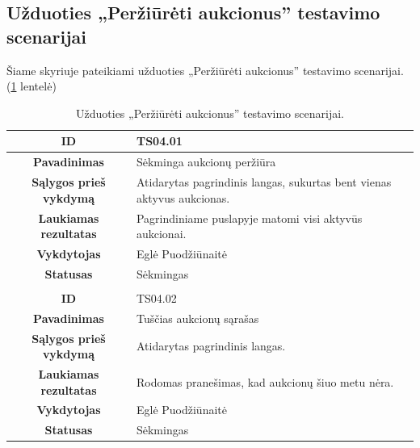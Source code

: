 \documentclass{VUMIFPSkursinis}
\begin{document}
			\subsection{Užduoties „Peržiūrėti aukcionus” testavimo scenarijai}
	Šiame skyriuje pateikiami užduoties „Peržiūrėti aukcionus” testavimo scenarijai. (\ref{perziura} lentelė)
	\begin{table}[H]
		\caption{Užduoties „Peržiūrėti aukcionus” testavimo scenarijai.}
		\begin{tabular}{|p{6cm}|p{11cm}|}
			\hline
			\multicolumn{1}{|c|}{{\bfseries ID}}&
			{TS04.01}\\
			\hline
			\multicolumn{1}{|c|}{{\bfseries Pavadinimas}}&
			{Sėkminga aukcionų peržiūra}\\
			\hline
			\multicolumn{1}{|c|}{{\bfseries Sąlygos prieš vykdymą}}&
			{Atidarytas pagrindinis langas, sukurtas bent vienas aktyvus aukcionas.}\\
			\hline
			\multicolumn{1}{|c|}{{\bfseries Laukiamas rezultatas}}&
			{Pagrindiniame puslapyje matomi visi aktyvūs aukcionai.}\\
			\hline
			\multicolumn{1}{|c|}{{\bfseries Vykdytojas}}&
			{Eglė Puodžiūnaitė}\\
			\hline
			\multicolumn{1}{|c|}{{\bfseries Statusas}}&
			{Sėkmingas}\\
			\hline
			\rowcolor{lightgray}
			\multicolumn{2}{|c|}{}\\
			\hline
			\multicolumn{1}{|c|}{{\bfseries ID}}&
			{TS04.02}\\
			\hline
			\multicolumn{1}{|c|}{{\bfseries Pavadinimas}}&
			{Tuščias aukcionų sąrašas}\\
			\hline
			\multicolumn{1}{|c|}{{\bfseries Sąlygos prieš vykdymą}}&
			{Atidarytas pagrindinis langas.}\\
			\hline
			\multicolumn{1}{|c|}{{\bfseries Laukiamas rezultatas}}&
			{Rodomas pranešimas, kad aukcionų šiuo metu nėra.}\\
			\hline
			\multicolumn{1}{|c|}{{\bfseries Vykdytojas}}&
			{Eglė Puodžiūnaitė}\\
			\hline
			\multicolumn{1}{|c|}{{\bfseries Statusas}}&
			{Sėkmingas}\\
			\hline
		\end{tabular}
		\label{perziura}
	\end{table}	
\end{document}

